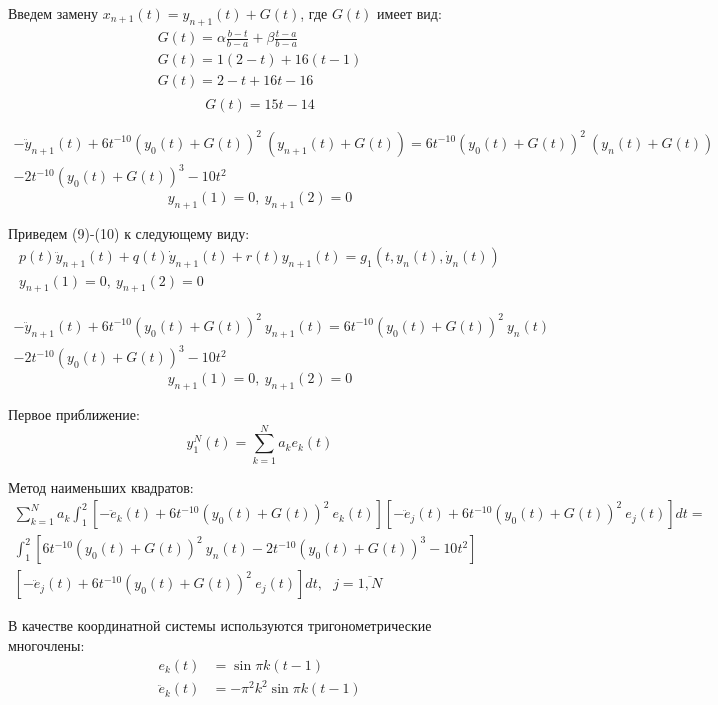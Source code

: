 \documentclass[12pt]{article}
\begin{document}
Введем замену $x_{n+1}(t) = y_{n+1}(t) + G(t)$, где $G(t)$ имеет вид:
\begin{gather*}
	G(t) = \alpha \frac{b-t}{b-a} + \beta \frac{t-a}{b-a} \\
	G(t) = 1 (2-t) + 16 (t-1) \\
	G(t) = 2-t + 16t-16 \\
\end{gather*}
\begin{equation}
	G(t) = 15t - 14
\end{equation}

\begin{multline}
-\ddot{y}_{n+1}(t) + 6t^{-10}(y_0(t) + G(t))^2\ (y_{n+1}(t) + G(t)) =
 6t^{-10}(y_0(t) + G(t))^2\ (y_n(t) + G(t)) \\- 2t^{-10}(y_0(t) + G(t))^3 - 10t^2
\end{multline}
\begin{equation}
y_{n+1}(1)=0,\ y_{n+1}(2)=0
\end{equation}

Приведем (9)-(10) к следующему виду:
\begin{gather}
p(t)\ddot{y}_{n+1}(t) + q(t)\dot{y}_{n+1}(t) + r(t)y_{n+1}(t) = g_1(t, y_n(t), \dot{y}_n(t)) \\
y_{n+1}(1) = 0,\ y_{n+1}(2) = 0
\end{gather}

\begin{multline}
-\ddot{y}_{n+1}(t) + 6t^{-10}(y_0(t) + G(t))^2\ y_{n+1}(t) =
6t^{-10}(y_0(t) + G(t))^2\ y_n(t) \\- 2t^{-10}(y_0(t) + G(t))^3 - 10t^2
\end{multline}
\begin{equation}
y_{n+1}(1) = 0,\ y_{n+1}(2) = 0
\end{equation}

Первое приближение:
\begin{equation}
y_1^N(t) = \sum_{k = 1}^{N}a_ke_k(t)
\end{equation}

Метод наименьших квадратов:
\begin{multline}
\sum_{k = 1}^{N}a_k \int_1^2 [-\ddot{e}_k(t) + 6t^{-10}(y_0(t) + G(t))^2\ e_k(t)]
[-\ddot{e}_j(t) + 6t^{-10}(y_0(t) + G(t))^2\ e_j(t)]dt = \\
\int_1^2[6t^{-10}(y_0(t)+G(t))^2\ y_n(t) - 2t^{-10}(y_0(t)+G(t))^3 - 10t^2]\\ [-\ddot{e}_j(t) + 6t^{-10}(y_0(t) + G(t))^2\ e_j(t)]dt,\ \ \
j = \overline{1,N}
\end{multline}

В качестве координатной системы используются тригонометрические многочлены:
\begin{equation}
\begin{split}
e_k(t) &= \sin{\pi k (t - 1)} \\
\ddot{e}_k(t)&= -\pi^2 k^2\sin{\pi k(t-1)}
\end{split}
\end{equation}
\end{document}
